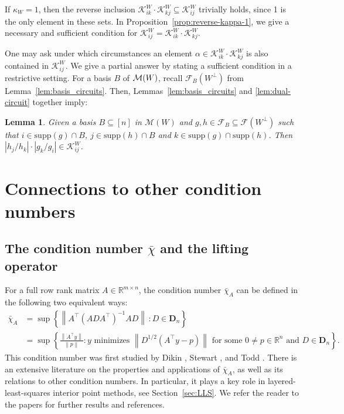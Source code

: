 \documentclass[11pt, a4paper]{article}
\newcommand{\Le}{\kappa}
\newcommand{\norm}[1]{\left\lVert#1\right\rVert}
\newcommand{\supp}{\mathrm{supp}}
\newcommand{\1}{\mathbbm{1}}
\newcommand{\KK}{\mathcal K}
\newcommand{\EE}{\mathcal F}
\newcommand{\bD}{\mathbf{D}}
\newtheorem{lemma}[theorem]{Lemma}
\theoremstyle{case}
\newcommand{\R}{\mathbb{R}}
\begin{document}
If $\Le_W=1$, then the reverse inclusion 
$ \KK_{ik}^W \cdot \KK_{kj}^W \subseteq \KK_{ij}^W$ trivially holds, since 1 is the only element in these sets. In Proposition~\ref{prop:reverse-kappa-1}, we give a necessary and sufficient condition for $\KK_{ij}^W= \KK_{ik}^W \cdot \KK_{kj}^W$.

One may ask under which circumstances an element $\alpha \in \KK_{ik}^W\cdot \KK_{kj}^W$ is also contained in $\KK_{ij}^W$. We give a partial answer by stating a sufficient condition in a  restrictive setting. For a basis $B$ of ${\cal M}(W)$, recall $\EE_B(W^\perp)$ from Lemma~\ref{lem:basis_circuits}. Then, Lemmas~\ref{lem:basis_circuits} and \ref{lem:dual-circuit} together imply:

\begin{lemma}
Given a basis $B \subseteq [n]$ in $\mathcal{M}(W)$ and $g,h \in \EE_B \subseteq \EE(W^\perp)$ such that $i \in \supp(g) \cap B$, $j \in \supp(h) \cap B$ and $k \in \supp(g) \cap \supp(h)$.
Then $|h_j/h_k|\cdot |g_k/g_i| \in \KK_{ij}^W$.
\end{lemma} 

\section{Connections to other condition numbers}\label{sec:connections}
\subsection{The condition number \texorpdfstring{$\bar\chi$}{chi bar} and the lifting operator}
\label{subsec:lifting_operator}

For a full row rank matrix $A\in \R^{m\times n}$, the
 condition number $\bar\chi_A$ can be defined in the following two equivalent ways:
\begin{equation}
\begin{aligned}
\bar\chi_A&=\sup\left\{\left\|A^\top \left(A D A^\top\right)^{-1}AD\right\|\, : D\in
    \bD_n\right\}\\
&=\sup\left\{\frac{\norm{A^\top y}}{\norm{p}} :
\text{$y$ minimizes $\norm{D^{1/2}(A^\top y - p)}$ for some $0 \neq p \in \R^n$ and $D \in \bD_n$}\right\}.
\end{aligned}
\end{equation}
This condition number was first studied by Dikin \cite{dikin}, Stewart \cite{stewart}, and
Todd \cite{todd-90}. There is an
extensive literature on the properties and applications of $\bar\chi_A$,
as well as its
relations to other condition numbers. In particular, it plays 
a key role in layered-least-squares  interior point methods, see Section~\ref{sec:LLS}.  We refer the reader to
the papers \cite{ho2002,Monteiro2003,Vavasis1996} for further results
and references.
\end{document}
